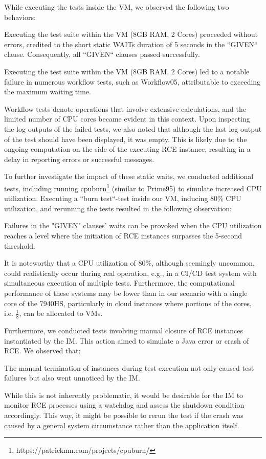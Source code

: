 While executing the tests inside the \ac{VM}, we observed the following two behaviors:
\begin{observation}
    Executing the test suite within the VM (8GB RAM, 2 Cores) proceeded without errors, credited to the short static WAITs duration of 5 seconds in the ``GIVEN`` clause. Consequently, all ``GIVEN`` clauses passed successfully.
\end{observation}
\begin{observation}
    Executing the test suite within the VM (8GB RAM, 2 Cores) led to a notable failure in numerous workflow tests, such as Workflow05, attributable to exceeding the maximum waiting time.
\end{observation}
Workflow tests denote operations that involve extensive calculations, and the limited number of CPU cores became evident in this context. Upon inspecting the log outputs of the failed tests, we also noted that although the last log output of the test should have been displayed, it was empty. This is likely due to the ongoing computation on the side of the executing \ac{RCE} instance, resulting in a delay in reporting errors or successful messages.

To further investigate the impact of these static waits, we conducted additional tests, including running cpuburn\footnote{https://patrickmn.com/projects/cpuburn/} (similar to Prime95) to simulate increased CPU utilization. Executing a ``burn test``-test inside our VM, inducing 80\% CPU utilization, and rerunning the tests resulted in the following observation:
\begin{observation}
    Failures in the "GIVEN" clauses' waits can be provoked when the CPU utilization reaches a level where the initiation of RCE instances surpasses the 5-second threshold.
\end{observation}

It is noteworthy that a CPU utilization of 80\%, although seemingly uncommon, could realistically occur during real operation, e.g., in a CI/CD test system with simultaneous execution of multiple tests. Furthermore, the computational performance of these systems may be lower than in our scenario with a single core of the 7940HS, particularly in cloud instances where portions of the cores, i.e. $\frac{1}{8}$, can be allocated to \acp{VM}.

Furthermore, we conducted tests involving manual closure of \ac{RCE} instances instantiated by the \ac{IM}. This action aimed to simulate a Java error or crash of \ac{RCE}. We observed that:
\begin{observation}
    The manual termination of instances during test execution not only caused test failures but also went unnoticed by the \acl{IM}.
\end{observation}
While this is not inherently problematic, it would be desirable for the \ac{IM} to monitor \ac{RCE} processes using a watchdog and assess the shutdown condition accordingly. This way, it might be possible to rerun the test if the crash was caused by a general system circumstance rather than the application itself.

